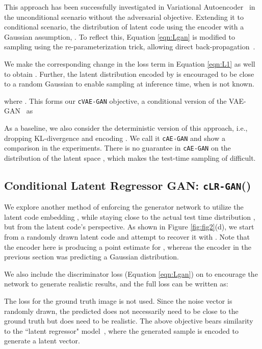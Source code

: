 \documentclass{article}
\newcommand{\cinfogan}{\texttt{cLR-GAN}\xspace}
\newcommand{\cae}{\texttt{cAE-GAN}\xspace}
\newcommand{\cvaegan}{\texttt{cVAE-GAN}\xspace}
\begin{document}
This approach has been successfully investigated in Variational Autoencoder~\citep{kingma2013auto} in the unconditional scenario without the adversarial objective. Extending it to conditional scenario, the distribution  of latent code  using the encoder  with a Gaussian assumption, . To reflect this, Equation \ref{eqn:Lgan} is modified to sampling  using the re-parameterization trick, allowing direct back-propagation~\citep{kingma2013auto}. 

We make the corresponding change in the  loss term in Equation \ref{eqn:L1} as well to obtain . Further, the latent distribution encoded by  is encouraged to be close to a random Gaussian to enable sampling at inference time, when  is not known.

where . This forms our \cvaegan objective, a conditional version of the VAE-GAN~\citep{larsen2016vaegan} as


As a baseline, we also consider the deterministic version of this approach, i.e., dropping KL-divergence and encoding .
We call it \cae and show a comparison in the experiments.
There is no guarantee in \cae on the distribution of the latent space , which makes the test-time sampling of  difficult. 

\subsection{Conditional Latent Regressor GAN: \cinfogan ()}
We explore another method of enforcing the generator network to utilize the latent code embedding , while staying close to the actual test time distribution , but from the latent code's perspective.
As shown in Figure \ref{fig:fig2}(d), we start from a 
randomly drawn latent code  and attempt to recover it with .
Note that the encoder  here is producing a point estimate for , whereas the encoder in the previous section was predicting a Gaussian distribution.


We also include the discriminator loss  (Equation \ref{eqn:Lgan}) on  to encourage the network to generate realistic results, and the full loss can be written as:


The  loss for the ground truth image  is not used. Since the noise vector is randomly drawn, the predicted  does not necessarily need to be close to the ground truth but does need to be realistic. The above objective bears similarity to the ``latent regressor" model~\citep{donahue2016adversarial,dumoulin2016adversarially,xi2016infogan}, where the generated sample  is encoded to generate a latent vector.
\end{document}
